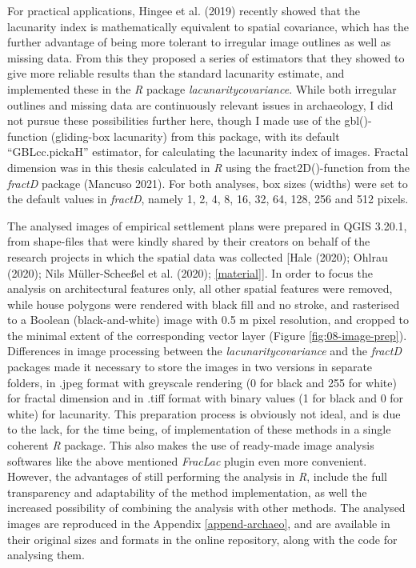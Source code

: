 \documentclass[
  12pt,
  a4paper, twoside]{book}
\begin{document}
For practical applications, Hingee et al. (2019) recently showed that the lacunarity index is mathematically equivalent to spatial covariance, which has the further advantage of being more tolerant to irregular image outlines as well as missing data. From this they proposed a series of estimators that they showed to give more reliable results than the standard lacunarity estimate, and implemented these in the \emph{R} package \emph{lacunaritycovariance}. While both irregular outlines and missing data are continuously relevant issues in archaeology, I did not pursue these possibilities further here, though I made use of the gbl()-function (gliding-box lacunarity) from this package, with its default ``GBLcc.pickaH'' estimator, for calculating the lacunarity index of images. Fractal dimension was in this thesis calculated in \emph{R} using the fract2D()-function from the \emph{fractD} package (Mancuso 2021). For both analyses, box sizes (widths) were set to the default values in \emph{fractD}, namely 1, 2, 4, 8, 16, 32, 64, 128, 256 and 512 pixels.

The analysed images of empirical settlement plans were prepared in QGIS 3.20.1, from shape-files that were kindly shared by their creators on behalf of the research projects in which the spatial data was collected {[}Hale (2020); Ohlrau (2020); Nils Müller-Scheeßel et al. (2020); \ref{material}{]}. In order to focus the analysis on architectural features only, all other spatial features were removed, while house polygons were rendered with black fill and no stroke, and rasterised to a Boolean (black-and-white) image with 0.5 m pixel resolution, and cropped to the minimal extent of the corresponding vector layer (Figure \ref{fig:08-image-prep}). Differences in image processing between the \emph{lacunaritycovariance} and the \emph{fractD} packages made it necessary to store the images in two versions in separate folders, in .jpeg format with greyscale rendering (0 for black and 255 for white) for fractal dimension and in .tiff format with binary values (1 for black and 0 for white) for lacunarity. This preparation process is obviously not ideal, and is due to the lack, for the time being, of implementation of these methods in a single coherent \emph{R} package. This also makes the use of ready-made image analysis softwares like the above mentioned \emph{FracLac} plugin even more convenient. However, the advantages of still performing the analysis in \emph{R}, include the full transparency and adaptability of the method implementation, as well the increased possibility of combining the analysis with other methods. The analysed images are reproduced in the Appendix \ref{append-archaeo}, and are available in their original sizes and formats in the online repository, along with the code for analysing them.
\end{document}
